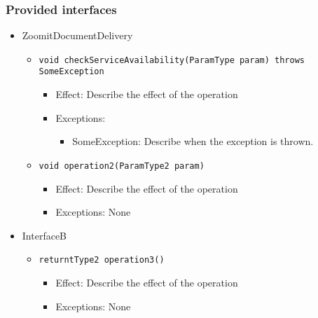 \begin{itemize}
\subsubsection*{Provided interfaces}
\begin{itemize}
    \item ZoomitDocumentDelivery
    \begin{itemize}
        \item \texttt{void checkServiceAvailability(ParamType param) throws SomeException}
        \begin{itemize}
            \item Effect: Describe the effect of the operation
            \item Exceptions:
            \begin{itemize}
                \item SomeException: Describe when the exception is thrown.
            \end{itemize}
        \end{itemize}

        \item \texttt{void operation2(ParamType2 param)}
		    \begin{itemize}
                \item Effect: Describe the effect of the operation
                \item Exceptions: None
            \end{itemize}
    \end{itemize}

    \item InterfaceB
    \begin{itemize}
        \item \texttt{returntType2 operation3()}
        \begin{itemize}
            \item Effect: Describe the effect of the operation
            \item Exceptions: None
        \end{itemize}
    \end{itemize}
\end{itemize}

\end{itemize}